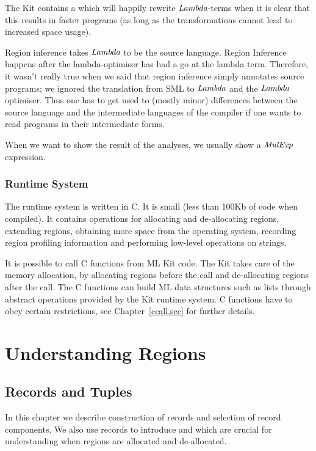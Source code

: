 \documentclass[12pt]{book}
\begin{document}
The Kit contains a 
which will happily rewrite $\hbox{\it Lambda}$-terms when it is clear that this results in faster programs
(as long as the transformations cannot lead to increased space usage).

Region inference takes $\hbox{\it Lambda}$ to be the source language. Region Inference happens after
the lambda-optimiser has had a go at the lambda term. 
Therefore, it wasn't really true when we said that region inference simply annotates source
programs;  we ignored the translation from SML to $\hbox{\it Lambda}$ and
the $\hbox{\it Lambda}$ optimiser. Thus one has to get used to (mostly minor) differences between
the source language and the intermediate languages of the compiler if one wants to read
programs in their intermediate forms.

When we want to show the result of the analyses, we usually show a $\hbox{\it MulExp}$ expression.

\section{Runtime System}
The runtime system is written in C. It is small (less than 100Kb 
of code when compiled).
It contains operations for allocating and de-allocating regions, extending regions,
obtaining more space from the operating system, recording region profiling information and performing
low-level operations on strings.

It is possible to call C functions from ML Kit code. The Kit takes care of the memory
allocation, by allocating regions before the call and de-allocating regions after the
call. The C functions can build ML data structures such as lists through abstract operations provided
by the Kit runtime system. C functions have to obey certain restrictions,  
see Chapter~\ref{ccall.sec}
for further details.

\part{Understanding Regions}
\label{understanding.sec}
\chapter{Records and Tuples}
In this chapter we describe construction of records and selection of record
components. We also use records to introduce   and  which are crucial for understanding when regions are allocated
and de-allocated.
\end{document}
